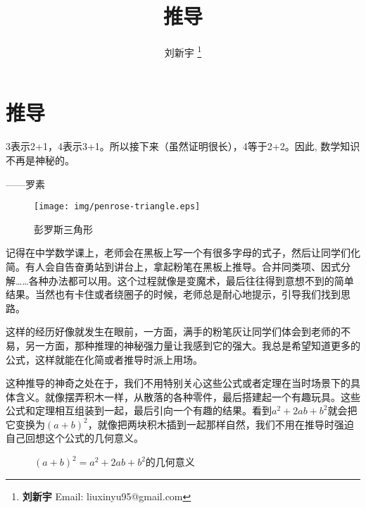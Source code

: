 \documentclass{article}
\begin{document}
\title{推导}

\author{刘新宇
\thanks{{\bfseries 刘新宇} \newline
  Email: liuxinyu95@gmail.com \newline}
  }

\maketitle
\fi


\ifx\wholebook\relax
\chapter{推导}
\fi

\epigraph{3表示2+1，4表示3+1。所以接下来（虽然证明很长），4等于2+2。因此, 数学知识不再是神秘的。}{——罗素}


\begin{wrapfigure}{R}{0.4\textwidth}
 \centering
 \texttt{[image: img/penrose-triangle.eps]}
 \captionsetup{labelformat=empty}
 \caption{彭罗斯三角形}
 \label{fig:Penrose-triangle}
\end{wrapfigure}

记得在中学数学课上，老师会在黑板上写一个有很多字母的式子，然后让同学们化简。有人会自告奋勇站到讲台上，拿起粉笔在黑板上推导。合并同类项、因式分解……各种办法都可以用。这个过程就像是变魔术，最后往往得到意想不到的简单结果。当然也有卡住或者绕圈子的时候，老师总是耐心地提示，引导我们找到思路。

这样的经历好像就发生在眼前，一方面，满手的粉笔灰让同学们体会到老师的不易，另一方面，那种推理的神秘强力量让我感到它的强大。我总是希望知道更多的公式，这样就能在化简或者推导时派上用场。

这种推导的神奇之处在于，我们不用特别关心这些公式或者定理在当时场景下的具体含义。就像摆弄积木一样，从散落的各种零件，最后搭建起一个有趣玩具。这些公式和定理相互组装到一起，最后引向一个有趣的结果。看到$a^2 + 2ab + b^2$就会把它变换为$(a+b)^2$，就像把两块积木插到一起那样自然，我们不用在推导时强迫自己回想这个公式的几何意义。

\begin{figure}[htbp]
\centering
{}
\caption{$(a + b)^2 = a^2 + 2ab + b^2$的几何意义}
\end{figure}
\end{document}
